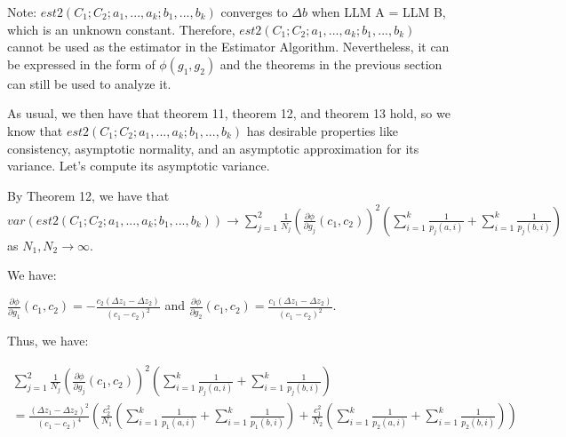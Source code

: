 \documentclass{article}
\begin{document}
Note: $\displaystyle est2\left( C_{1} ;C_{2} ;a_{1} ,...,a_{k} ;b_{1} ,...,b_{k}\right)$ converges to $\displaystyle \Delta b$ when LLM A = LLM B, which is an unknown constant. Therefore, $\displaystyle est2\left( C_{1} ;C_{2} ;a_{1} ,...,a_{k} ;b_{1} ,...,b_{k}\right)$ cannot be used as the estimator in the Estimator Algorithm. Nevertheless, it can be expressed in the form of $\displaystyle \phi \left( g_{1} ,g_{2}\right)$ and the theorems in the previous section can still be used to analyze it.



As usual, we then have that theorem 11, theorem 12, and theorem 13 hold, so we know that $\displaystyle est2\left( C_{1} ;C_{2} ;a_{1} ,...,a_{k} ;b_{1} ,...,b_{k}\right)$ has desirable properties like consistency, asymptotic normality, and an asymptotic approximation for its variance. Let's compute its asymptotic variance.



By Theorem 12, we have that $\displaystyle var\left( est2\left( C_{1} ;C_{2} ;a_{1} ,...,a_{k} ;b_{1} ,...,b_{k}\right)\right)\rightarrow \sum _{j=1}^{2}\frac{1}{N_{j}}\left(\frac{\partial \phi }{\partial g_{j}}\left( c_{1} ,c_{2}\right)\right)^{2}\left(\sum _{i=1}^{k}\frac{1}{p_{j}\left( a,i\right)} +\sum _{i=1}^{k}\frac{1}{p_{j}\left( b,i\right)}\right)$ as $\displaystyle N_{1} ,N_{2}\rightarrow \infty $.

We have:

$\displaystyle \frac{\partial \phi }{\partial g_{1}}\left( c_{1} ,c_{2}\right) =-\frac{c_{2}\left( \Delta z_{1} -\Delta z_{2}\right)}{\left( c_{1} -c_{2}\right)^{2}}$ and $\displaystyle \frac{\partial \phi }{\partial g_{2}}\left( c_{1} ,c_{2}\right) =\frac{c_{1}\left( \Delta z_{1} -\Delta z_{2}\right)}{\left( c_{1} -c_{2}\right)^{2}}$.



Thus, we have:

$\displaystyle  \begin{array}{l}
\sum _{j=1}^{2}\frac{1}{N_{j}}\left(\frac{\partial \phi }{\partial g_{j}}\left( c_{1} ,c_{2}\right)\right)^{2}\left(\sum _{i=1}^{k}\frac{1}{p_{j}\left( a,i\right)} +\sum _{i=1}^{k}\frac{1}{p_{j}\left( b,i\right)}\right)\\
=\frac{\left( \Delta z_{1} -\Delta z_{2}\right)^{2}}{\left( c_{1} -c_{2}\right)^{4}}\left(\frac{c_{2}^{2}}{N_{1}}\left(\sum _{i=1}^{k}\frac{1}{p_{1}\left( a,i\right)} +\sum _{i=1}^{k}\frac{1}{p_{1}\left( b,i\right)}\right) +\frac{c_{1}^{2}}{N_{2}}\left(\sum _{i=1}^{k}\frac{1}{p_{2}\left( a,i\right)} +\sum _{i=1}^{k}\frac{1}{p_{2}\left( b,i\right)}\right)\right)
\end{array}$
\end{document}
